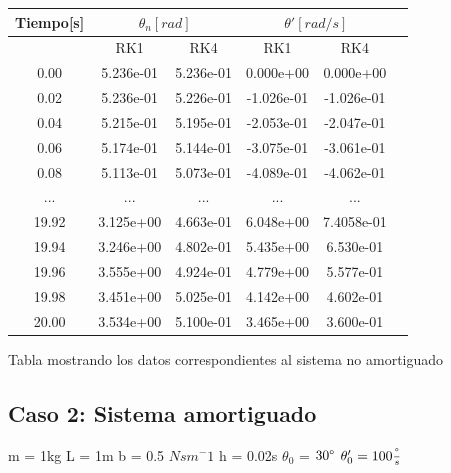 \documentclass[titlepage,a4paper]{article}
\begin{document}
    \begin{center}
        \begin{tabular}{| c | c | c | c | c | c|}
            \hline
           Tiempo[s] &\multicolumn{2}{|c|}{$\theta_n[rad]$} &\multicolumn{2}{|c|}{$\theta'[rad/s]$} \tabularnewline
            \hline
            &RK1&RK4&RK1&RK4\\
            \hline
            0.00&5.236e-01&5.236e-01&0.000e+00&0.000e+00\\
            0.02&5.236e-01&5.226e-01&-1.026e-01&-1.026e-01\\
            0.04&5.215e-01&5.195e-01&-2.053e-01&-2.047e-01\\
            0.06&5.174e-01&5.144e-01&-3.075e-01&-3.061e-01\\
            0.08&5.113e-01&5.073e-01&-4.089e-01&-4.062e-01\\
            ...&...&...&...&...\\
            19.92&3.125e+00&4.663e-01&6.048e+00&7.4058e-01\\
            19.94&3.246e+00&4.802e-01&5.435e+00&6.530e-01\\
            19.96&3.555e+00&4.924e-01&4.779e+00&5.577e-01\\
            19.98&3.451e+00&5.025e-01&4.142e+00&4.602e-01\\
            20.00&3.534e+00&5.100e-01&3.465e+00&3.600e-01\\
            \hline
        \end{tabular}
        
        \smallskip
        Tabla mostrando los datos correspondientes al sistema no amortiguado
    \end{center}

\subsection{Caso 2: Sistema amortiguado}

    \begin{center}
        m = 1kg \hspace{3mm}
        L = 1m \hspace{3mm}
        b = 0.5 $Nsm^-1$ \hspace{3mm}
        h = 0.02s \hspace{3mm}
        $\theta_0$ = $30\degree$ \hspace{3mm}
        $\theta'_0 = 100\frac{\degree}{s}$ \hspace{3mm}
    \end{center}
    
\end{document}
